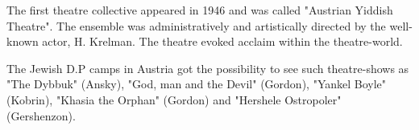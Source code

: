 \documentclass{article}
\begin{document}
\begin{pairs}
\begin{Leftside}
\begin{english}
The first theatre collective appeared in 1946 and was called "Austrian Yiddish Theatre". The ensemble was administratively and 
artistically directed by the well-known actor, H. Krelman. The theatre evoked acclaim within the theatre-world.

The Jewish D.P camps in Austria got the possibility to see such theatre-shows as "The Dybbuk" (Ansky),
"God, man and the Devil" (Gordon), "Yankel Boyle" (Kobrin), "Khasia the Orphan" (Gordon) and "Hershele Ostropoler" (Gershenzon).

\endnumbering
\end{english}
\end{Leftside}

\end{pairs}
\Columns
\end{document}
